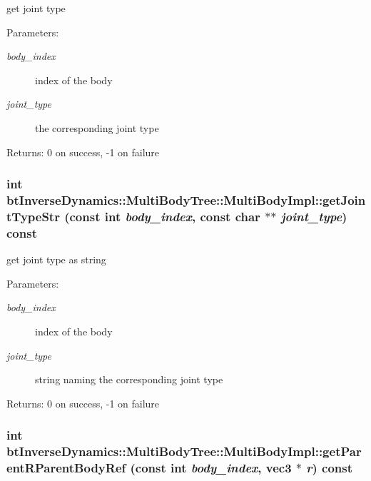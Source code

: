 get joint type \begin{Desc}
\item[Parameters:]
\begin{description}
\item[{\em body\_\-index}]index of the body \item[{\em joint\_\-type}]the corresponding joint type \end{description}
\end{Desc}
\begin{Desc}
\item[Returns:]0 on success, -1 on failure \end{Desc}
 \hypertarget{classbt_inverse_dynamics_1_1_multi_body_tree_1_1_multi_body_impl_42b50ff5d4a4dad7687d8716e737cf04}{
\subsubsection[getJointTypeStr]{\setlength{\rightskip}{0pt plus 5cm}int btInverseDynamics::MultiBodyTree::MultiBodyImpl::getJointTypeStr (const int {\em body\_\-index}, \/  const char $\ast$$\ast$ {\em joint\_\-type}) const}}
\label{classbt_inverse_dynamics_1_1_multi_body_tree_1_1_multi_body_impl_42b50ff5d4a4dad7687d8716e737cf04}


get joint type as string \begin{Desc}
\item[Parameters:]
\begin{description}
\item[{\em body\_\-index}]index of the body \item[{\em joint\_\-type}]string naming the corresponding joint type \end{description}
\end{Desc}
\begin{Desc}
\item[Returns:]0 on success, -1 on failure \end{Desc}
 \hypertarget{classbt_inverse_dynamics_1_1_multi_body_tree_1_1_multi_body_impl_92f65125b9ebf8c347e4f52df440f69b}{
\subsubsection[getParentRParentBodyRef]{\setlength{\rightskip}{0pt plus 5cm}int btInverseDynamics::MultiBodyTree::MultiBodyImpl::getParentRParentBodyRef (const int {\em body\_\-index}, \/  {\bf vec3} $\ast$ {\em r}) const}}
\label{classbt_inverse_dynamics_1_1_multi_body_tree_1_1_multi_body_impl_92f65125b9ebf8c347e4f52df440f69b}


